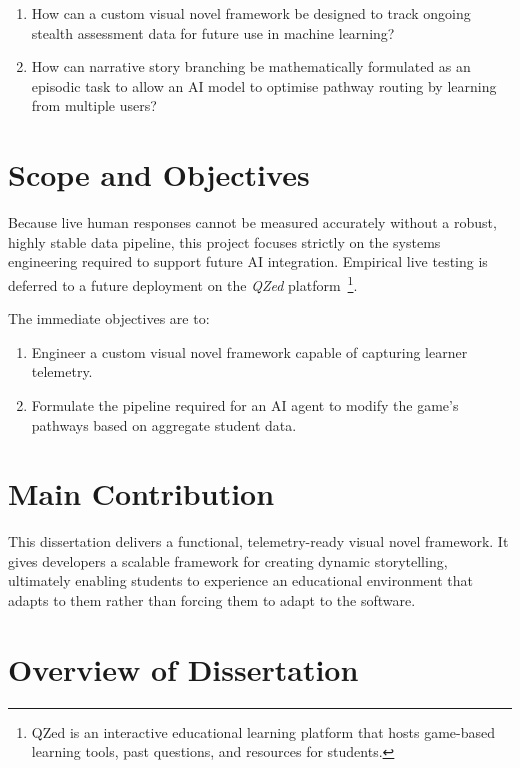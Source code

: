 \documentclass[12pt,a4paper]{report}
\begin{document}
\begin{enumerate}
    \item How can a custom visual novel framework be designed to track ongoing stealth assessment data for future use in machine learning?

    \item How can narrative story branching be mathematically formulated as an episodic task to allow an AI model to optimise pathway routing by learning from multiple users?
\end{enumerate}

\newpage
\section{Scope and Objectives} \label{objectives sec}

\quad Because live human responses cannot be measured accurately without a robust, highly stable data pipeline, this project focuses strictly on the systems engineering required to support future AI integration. Empirical live testing is deferred to a future deployment on the \textit{QZed} platform~\footnote{QZed is an interactive educational learning platform that hosts game-based learning tools, past questions, and resources for students.}.

The immediate objectives are to:

\begin{enumerate}
    \item Engineer a custom visual novel framework capable of capturing learner telemetry.

    \item Formulate the pipeline required for an AI agent to modify the game's pathways based on aggregate student data.
\end{enumerate}


\section{Main Contribution}

\quad This dissertation delivers a functional, telemetry-ready visual novel framework. It gives developers a scalable framework for creating dynamic storytelling, ultimately enabling students to experience an educational environment that adapts to them rather than forcing them to adapt to the software.


\section{Overview of Dissertation}
\end{document}
